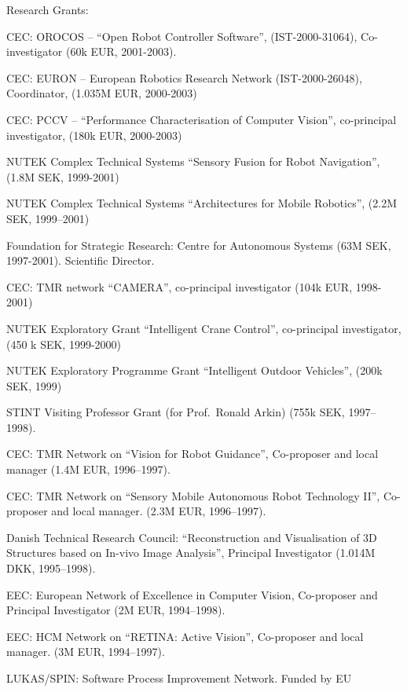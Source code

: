 \documentclass{article}
\begin{document}
\begin{cv}
\begin{cvlist}{Research Grants:}
\item CEC: OROCOS -- ``Open Robot Controller Software'',
  (IST-2000-31064), Co-investigator (60k EUR, 2001-2003).%
\item CEC: EURON -- European Robotics Research Network
  (IST-2000-26048), Coordinator, (1.035M EUR, 2000-2003)%
\item CEC: PCCV -- ``Performance Characterisation of Computer
  Vision'',  co-principal investigator, (180k EUR, 2000-2003)%
\item NUTEK Complex Technical Systems ``Sensory Fusion for Robot
  Navigation'', (1.8M SEK, 1999-2001)%
\item NUTEK Complex Technical Systems ``Architectures for Mobile
  Robotics'', (2.2M SEK, 1999--2001)%
\item Foundation for Strategic Research: Centre for Autonomous Systems
  (63M SEK, 1997-2001). Scientific Director.%
\item CEC: TMR network ``CAMERA'', co-principal investigator  (104k
  EUR, 1998-2001)%
\item NUTEK Exploratory Grant ``Intelligent Crane Control'',
  co-principal investigator, (450 k SEK, 1999-2000)%
\item NUTEK Exploratory Programme Grant ``Intelligent Outdoor
  Vehicles'', (200k SEK, 1999)%
\item STINT Visiting Professor Grant (for Prof.\ Ronald Arkin)  (755k
  SEK, 1997--1998).%
\item CEC: TMR Network on ``Vision for Robot Guidance'', Co-proposer
  and local manager (1.4M EUR, 1996--1997).%
\item CEC: TMR Network on ``Sensory Mobile Autonomous Robot Technology
  II'', Co-proposer and local manager.  (2.3M EUR, 1996--1997).%
\item Danish Technical Research Council: ``Reconstruction and
  Visualisation of 3D Structures based on In-vivo Image Analysis'',
  Principal Investigator (1.014M DKK, 1995--1998).%
\item EEC: European Network of Excellence in Computer Vision,
  Co-proposer and Principal Investigator (2M EUR, 1994--1998).%
\item EEC: HCM Network on ``RETINA: Active Vision'', Co-proposer and
  local manager.  (3M EUR, 1994--1997).%
\item LUKAS/SPIN: Software Process Improvement Network. Funded by EU

\end{cvlist}
\end{cv}
\end{document}
